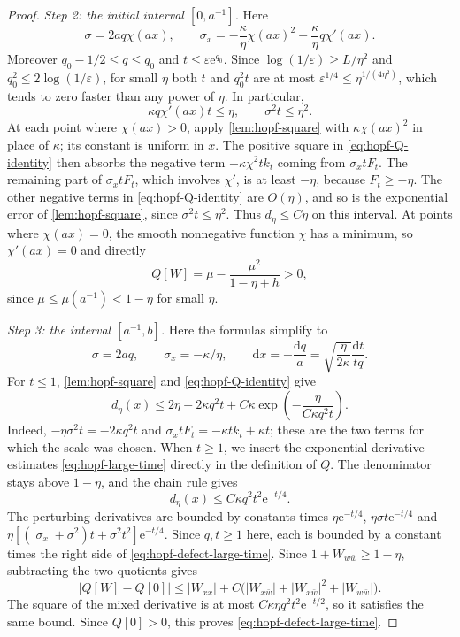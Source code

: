 \begin{proof}
\medskip\noindent\emph{Step 2: the initial interval $[0,a^{-1}]$.} Here
\[
 \sigma=2aq\chi(ax),\qquad
 \sigma_x=-\frac\kappa\eta\chi(ax)^2
               +\frac\kappa\eta q\chi'(ax).
\]
Moreover $q_0-1/2\leq q\leq q_0$ and $t\leq\varepsilon \mathrm{e}^{q_0}$. Since $\log(1/\varepsilon)\geq L/\eta^2$ and $q_0^2\leq2\log(1/\varepsilon)$, for small $\eta$ both $t$ and $q_0^2t$ are at most $\varepsilon^{1/4}\leq\eta^{1/(4\eta^2)}$, which tends to zero faster than any power of $\eta$. In particular,
\[
 \kappa q\chi'(ax)t\leq\eta,\qquad \sigma^2t\leq\eta^2.
\]
At each point where $\chi(ax)>0$, apply \cref{lem:hopf-square} with $\kappa\chi(ax)^2$ in place of $\kappa$; its constant is uniform in $x$. The positive square in \eqref{eq:hopf-Q-identity} then absorbs the negative term $-\kappa\chi^2tk_t$ coming from $\sigma_xtF_t$. The remaining part of $\sigma_xtF_t$, which involves $\chi'$, is at least $-\eta$, because $F_t\geq-\eta$. The other negative terms in \eqref{eq:hopf-Q-identity} are $O(\eta)$, and so is the exponential error of \cref{lem:hopf-square}, since $\sigma^2t\leq\eta^2$. Thus $d_\eta\leq C\eta$ on this interval. At points where $\chi(ax)=0$, the smooth nonnegative function $\chi$ has a minimum, so $\chi'(ax)=0$ and directly
\[
 Q[W]=\mu-\frac{\mu^2}{1-\eta+h}>0,
\]
since $\mu\leq\mu(a^{-1})<1-\eta$ for small $\eta$.

\medskip\noindent\emph{Step 3: the interval $[a^{-1},b]$.} Here the formulas simplify to
\begin{equation}\label{eq:hopf-time-change}
 \sigma=2aq,\qquad \sigma_x=-\kappa/\eta,\qquad
 \mathrm{d}x=-\frac{\mathrm{d}q}{a}=\sqrt{\frac\eta{2\kappa}}\frac{\mathrm{d}t}{tq}.
\end{equation}
For $t\leq1$, \cref{lem:hopf-square} and \eqref{eq:hopf-Q-identity} give
\begin{equation}\label{eq:hopf-defect-small-time}
 d_\eta(x)\leq2\eta+2\kappa q^2t
          +C\kappa\exp\left(-\frac\eta{C\kappa q^2t}\right).
\end{equation}
Indeed, $-\eta\sigma^2t=-2\kappa q^2t$ and
$\sigma_xtF_t=-\kappa tk_t+\kappa t$; these are the two terms for which the scale was chosen. When $t\geq1$, we insert the exponential derivative estimates \eqref{eq:hopf-large-time} directly in the definition of $Q$. The denominator stays above $1-\eta$, and the chain rule gives
\begin{equation}\label{eq:hopf-defect-large-time}
 d_\eta(x)\leq C\kappa q^2t^2\mathrm{e}^{-t/4}.
\end{equation}
The perturbing derivatives are bounded by constants times
$\eta \mathrm{e}^{-t/4}$, $\eta\sigma t \mathrm{e}^{-t/4}$ and
$\eta[(|\sigma_x|+\sigma^2)t+\sigma^2t^2]\mathrm{e}^{-t/4}$. Since $q,t\geq1$ here, each is bounded by a constant times the right side of \eqref{eq:hopf-defect-large-time}. Since $1+W_{w\bar w}\geq1-\eta$, subtracting the two quotients gives
\[
 |Q[W]-Q[0]|\leq |W_{xx}|+
 C\bigl(|W_{x\bar w}|+|W_{x\bar w}|^2+|W_{w\bar w}|\bigr).
\]
The square of the mixed derivative is at most $C\kappa\eta q^2t^2\mathrm{e}^{-t/2}$, so it satisfies the same bound. Since $Q[0]>0$, this proves \eqref{eq:hopf-defect-large-time}.


\end{proof}
